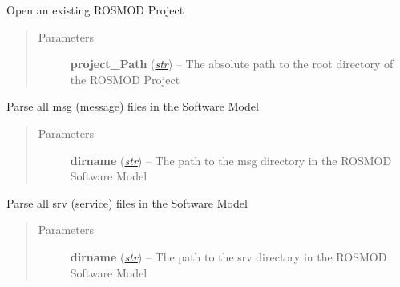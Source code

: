 \documentclass[letterpaper,10pt,english]{sphinxmanual}
\begin{document}
\begin{fulllineitems}
\begin{fulllineitems}
\begin{quote}
\begin{description}
\end{description}\end{quote}

\end{fulllineitems}


\begin{fulllineitems}
\label{class_Project:ROSMOD_Project.open}
Open an existing ROSMOD Project
\begin{quote}\begin{description}
\item[{Parameters}] \leavevmode
\textbf{project\_Path} (\href{http://docs.python.org/library/functions.html\#str}{\emph{str}}) -- The absolute path to the root directory of the ROSMOD Project

\end{description}\end{quote}

\end{fulllineitems}


\begin{fulllineitems}
\label{class_Project:ROSMOD_Project.parse_msg}
Parse all msg (message) files in the Software Model
\begin{quote}\begin{description}
\item[{Parameters}] \leavevmode
\textbf{dirname} (\href{http://docs.python.org/library/functions.html\#str}{\emph{str}}) -- The path to the msg directory in the ROSMOD Software Model

\end{description}\end{quote}

\end{fulllineitems}


\begin{fulllineitems}
\label{class_Project:ROSMOD_Project.parse_srv}
Parse all srv (service) files in the Software Model
\begin{quote}\begin{description}
\item[{Parameters}] \leavevmode
\textbf{dirname} (\href{http://docs.python.org/library/functions.html\#str}{\emph{str}}) -- The path to the srv directory in the ROSMOD Software Model


\end{description}
\end{quote}
\end{fulllineitems}
\end{fulllineitems}
\end{document}
